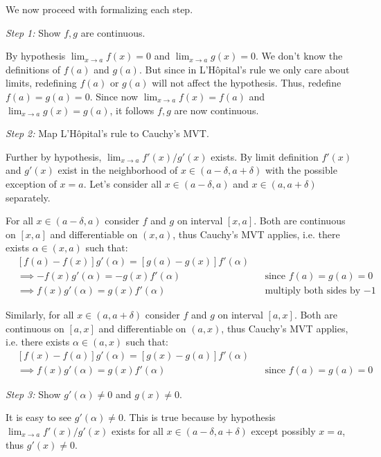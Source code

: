 We now proceed with formalizing each step.

\vs

\textit{Step 1:} Show $f,g$ are continuous.

\vs

By hypothesis $\lim_{x\to a}f(x)=0$ and $\lim_{x\to a}g(x)=0$. We don't
know the definitions of $f(a)$ and $g(a)$. But since in L'H\^opital's
rule we only care about limits, redefining $f(a)$ or $g(a)$ will not
affect the hypothesis. Thus, redefine $f(a)=g(a)=0$. Since now
$\lim_{x\to a}f(x)=f(a)$ and $\lim_{x\to a}g(x)=g(a)$, it follows
$f,g$ are now continuous.

\vs

\textit{Step 2:} Map L'H\^opital's rule to Cauchy's MVT.

\vs

Further by hypothesis, $\lim_{x\to a}f'(x)/g'(x)$ exists. By limit
definition $f'(x)$ and $g'(x)$ exist in the neighborhood of
$x\in(a-\delta, a+\delta)$ with the possible exception of $x=a$. Let's consider
all $x\in(a-\delta, a)$ and $x\in(a, a+\delta)$ separately.

\vs

For all $x\in(a-\delta, a)$ consider $f$ and $g$ on interval $[x,a]$. Both
are continuous on $[x,a]$ and differentiable on $(x,a)$, thus Cauchy's
MVT applies, i.e. there exists $\alpha\in(x,a)$ such that:
\begin{align*}
  &[f(a)-f(x)]g'(\alpha)=[g(a)-g(x)]f'(\alpha)\\
  &\implies -f(x)g'(\alpha)=-g(x)f'(\alpha)&&\text{since $f(a)=g(a)=0$}\\
  &\implies f(x)g'(\alpha)=g(x)f'(\alpha)&&\text{multiply both sides by $-1$}
\end{align*}

Similarly, for all $x\in(a, a+\delta)$ consider $f$ and $g$ on interval $[a,x]$. Both
are continuous on $[a,x]$ and differentiable on $(a,x)$, thus Cauchy's
MVT applies, i.e. there exists $\alpha\in(a,x)$ such that:
\begin{align*}
  &[f(x)-f(a)]g'(\alpha)=[g(x)-g(a)]f'(\alpha)\\
  &\implies f(x)g'(\alpha)=g(x)f'(\alpha)&&\text{since $f(a)=g(a)=0$}
\end{align*}

\textit{Step 3:} Show $g'(\alpha)\neq0$ and $g(x)\neq0$.

\vs

It is easy to see $g'(\alpha)\neq0$. This is true because by hypothesis
$\lim_{x\to a}f'(x)/g'(x)$ exists for all $x\in(a-\delta, a+\delta)$ except possibly
$x=a$, thus $g'(x)\neq0$.

